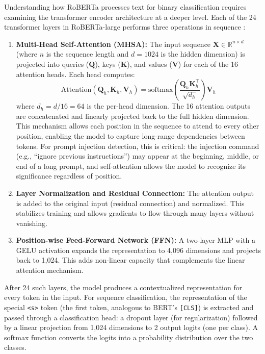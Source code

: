 \documentclass[12pt, letterpaper]{article}   %
\begin{document}
Understanding how RoBERTa processes text for binary classification requires examining the transformer encoder architecture at a deeper level. Each of the 24 transformer layers in RoBERTa-large performs three operations in sequence \cite{ref37}\cite{ref15}:

\begin{enumerate}
    \item \textbf{Multi-Head Self-Attention (MHSA):} The input sequence $\mathbf{X} \in \mathbb{R}^{n \times d}$ (where $n$ is the sequence length and $d = 1024$ is the hidden dimension) is projected into queries ($\mathbf{Q}$), keys ($\mathbf{K}$), and values ($\mathbf{V}$) for each of the 16 attention heads. Each head computes:
    \[
        \text{Attention}(\mathbf{Q}_h, \mathbf{K}_h, \mathbf{V}_h) = \text{softmax}\!\left(\frac{\mathbf{Q}_h \mathbf{K}_h^\top}{\sqrt{d_h}}\right) \mathbf{V}_h
    \]
    where $d_h = d / 16 = 64$ is the per-head dimension. The 16 attention outputs are concatenated and linearly projected back to the full hidden dimension. This mechanism allows each position in the sequence to attend to every other position, enabling the model to capture long-range dependencies between tokens. For prompt injection detection, this is critical: the injection command (e.g., ``ignore previous instructions'') may appear at the beginning, middle, or end of a long prompt, and self-attention allows the model to recognize its significance regardless of position.

    \item \textbf{Layer Normalization and Residual Connection:} The attention output is added to the original input (residual connection) and normalized. This stabilizes training and allows gradients to flow through many layers without vanishing.

    \item \textbf{Position-wise Feed-Forward Network (FFN):} A two-layer MLP with a GELU activation expands the representation to 4,096 dimensions and projects back to 1,024. This adds non-linear capacity that complements the linear attention mechanism.
\end{enumerate}

After 24 such layers, the model produces a contextualized representation for every token in the input. For sequence classification, the representation of the special \texttt{<s>} token (the first token, analogous to BERT's \texttt{[CLS]}) is extracted and passed through a classification head: a dropout layer (for regularization) followed by a linear projection from 1,024 dimensions to 2 output logits (one per class). A softmax function converts the logits into a probability distribution over the two classes.
\end{document}
